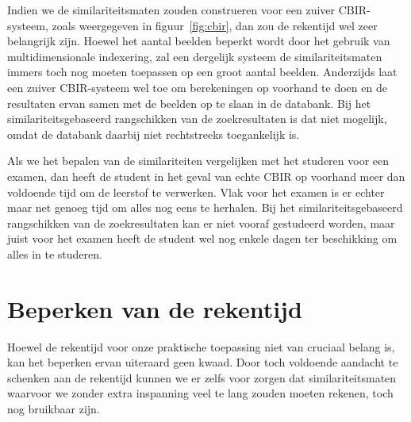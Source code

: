 Indien we de similariteitsmaten zouden construeren voor een zuiver CBIR-systeem, zoals weergegeven
in figuur~\ref{fig:cbir}, dan zou de rekentijd wel zeer belangrijk zijn. Hoewel het aantal
beelden beperkt wordt door het gebruik van multidimensionale indexering, zal een dergelijk
systeem de similariteitsmaten immers toch nog moeten toepassen op een groot aantal
beelden. Anderzijds laat een zuiver CBIR-systeem wel toe om berekeningen op voorhand te doen
en de resultaten ervan samen met de beelden op te slaan in de databank. Bij het similariteitsgebaseerd
rangschikken van de zoekresultaten is dat niet mogelijk, omdat de databank daarbij niet rechtstreeks
toegankelijk is.

Als we het bepalen van de similariteiten vergelijken met het studeren voor een examen, dan 
heeft de student in het geval van echte CBIR op voorhand meer dan voldoende tijd om de leerstof
te verwerken. Vlak voor het examen is er echter maar net genoeg tijd om alles nog eens 
te herhalen. Bij het similariteitsgebaseerd rangschikken van de zoekresultaten kan er niet vooraf 
gestudeerd worden, maar juist voor het examen heeft de student wel nog enkele dagen ter beschikking 
om alles in te studeren.


\section{Beperken van de rekentijd}
\label{sectie:beperken_rekentijd}

Hoewel de rekentijd voor onze praktische toepassing niet van cruciaal belang is, kan het beperken 
ervan uiteraard geen kwaad. Door toch voldoende aandacht te schenken aan de rekentijd kunnen
we er zelfs voor zorgen dat similariteitsmaten waarvoor we zonder extra inspanning veel te lang zouden 
moeten rekenen, toch nog bruikbaar zijn.

